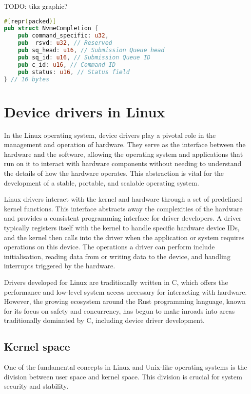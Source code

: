 TODO: tikz graphic?


\begin{lstlisting}[float,language=Rust,label=lst:nvme_completion,caption=NVMe completion entry defined as a struct in Rust]
#[repr(packed)]
pub struct NvmeCompletion {
    pub command_specific: u32,
    pub _rsvd: u32, // Reserved
    pub sq_head: u16, // Submission Queue head
    pub sq_id: u16, // Submission Queue ID
    pub c_id: u16, // Command ID
    pub status: u16, // Status field
} // 16 bytes
\end{lstlisting}


\section{Device drivers in Linux}
In the Linux operating system, device drivers play a pivotal role in the management and operation of hardware. They serve as the interface between the hardware and the software, allowing the operating system and applications that run on it to interact with hardware components without needing to understand the details of how the hardware operates. This abstraction is vital for the development of a stable, portable, and scalable operating system.

Linux drivers interact with the kernel and hardware through a set of predefined kernel functions. This interface abstracts away the complexities of the hardware and provides a consistent programming interface for driver developers. A driver typically registers itself with the kernel to handle specific hardware device IDs, and the kernel then calls into the driver when the application or system requires operations on this device. The operations a driver can perform include initialisation, reading data from or writing data to the device, and handling interrupts triggered by the hardware.

Drivers developed for Linux are traditionally written in C, which offers the performance and low-level system access necessary for interacting with hardware. However, the growing ecosystem around the Rust programming language, known for its focus on safety and concurrency, has begun to make inroads into areas traditionally dominated by C, including device driver development.


\subsection{Kernel space}
One of the fundamental concepts in Linux and Unix-like operating systems is the division between user space and kernel space. This division is crucial for system security and stability.

